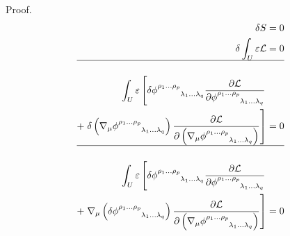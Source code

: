 \documentclass[9pt,handout]{beamer}
\begin{document}
\begin{frame}{}
\begin{block}{Proof.}
\begin{align*}
\delta S & = 0 \\ 
\delta \int_{U} \varepsilon \mathcal{L} & = 0 \\ 
\hline \\
\int_{U} \varepsilon \left[ \delta \phi^{\rho_1 \dots \rho_p}_{\phantom{\rho_1 \dots \rho_p} \lambda_1 \dots \lambda_q} \frac{\partial \mathcal{L}}{\partial \phi^{\rho_1 \dots \rho_p}_{\phantom{\rho_1 \dots \rho_p} \lambda_1 \dots \lambda_q}} \right. \\ 
+ \left. \delta \left( \nabla_\mu \phi^{\rho_1 \dots \rho_p}_{\phantom{\rho_1 \dots \rho_p} \lambda_1 \dots \lambda_q} \right) \frac{\partial \mathcal{L}}{\partial \left( \nabla_\mu \phi^{\rho_1 \dots \rho_p}_{\phantom{\rho_1 \dots \rho_p} \lambda_1 \dots \lambda_q} \right)} \right] & = 0 \\ 
\hline \\
\int_{U} \varepsilon \left[ \delta \phi^{\rho_1 \dots \rho_p}_{\phantom{\rho_1 \dots \rho_p} \lambda_1 \dots \lambda_q} \frac{\partial \mathcal{L}}{\partial \phi^{\rho_1 \dots \rho_p}_{\phantom{\rho_1 \dots \rho_p} \lambda_1 \dots \lambda_q}} \right. \\ 
+ \left. \nabla_\mu \left( \delta \phi^{\rho_1 \dots \rho_p}_{\phantom{\rho_1 \dots \rho_p} \lambda_1 \dots \lambda_q} \right) \frac{\partial \mathcal{L}}{\partial \left( \nabla_\mu \phi^{\rho_1 \dots \rho_p}_{\phantom{\rho_1 \dots \rho_p} \lambda_1 \dots \lambda_q} \right)} \right] & = 0
\end{align*}
\end{block}
\end{frame}
\end{document}
